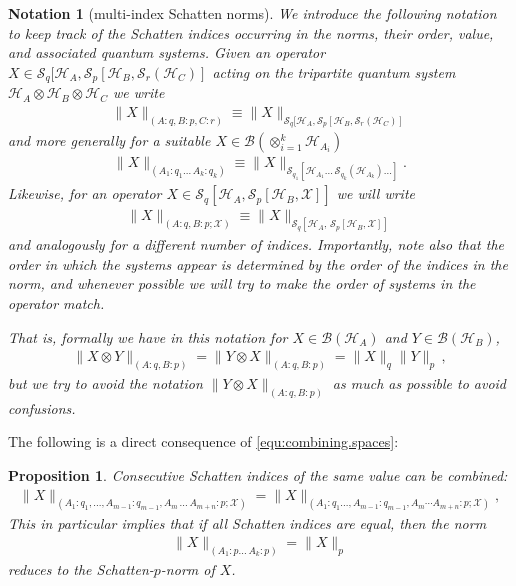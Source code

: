 \documentclass[11pt]{article}
\newcommand{\1}{\ensuremath{\mathbbm{1}}}
\theoremstyle{newdefinition}
\newtheorem{notation}{Notation}
\theoremstyle{newplain}
\newtheorem{proposition}[definition]{Proposition}
\theoremstyle{myplain}
\begin{document}
\begin{notation}[multi-index Schatten norms]
We introduce the following notation to keep track of the Schatten indices occurring in the norms, their order, value, and associated quantum systems.
Given an operator $X\in \mathcal{S}_q[\mathcal{H}_A,\mathcal{S}_p[\mathcal{H}_B,\mathcal{S}_r(\mathcal{H}_C)]$ acting on the tripartite quantum system $\mathcal{H}_A\otimes\mathcal{H}_B\otimes\mathcal{H}_C$ we write 
\begin{align}
    \|X\|_{(A:q,B:p,C:r)} \equiv \|X\|_{\mathcal{S}_q[\mathcal{H}_A,\mathcal{S}_p[\mathcal{H}_B,\mathcal{S}_r(\mathcal{H}_C)]}
\end{align} 
and more generally for a suitable $X\in\mathcal{B}(\otimes_{i=1}^k\mathcal{H}_{A_i})$
\begin{align}
    \|X\|_{(A_1:q_1...\,A_k:q_k)} \equiv \|X\|_{\mathcal{S}_{q_1}[\mathcal{H}_{A_1}...\,\mathcal{S}_{q_k}(\mathcal{H}_{A_k})...]}.
\end{align} 
Likewise, for an operator $X\in \mathcal{S}_q[\mathcal{H}_A,\mathcal{S}_p[\mathcal{H}_B,\mathcal{X}]]$ we will write
\begin{align}
    \|X\|_{(A:q,B:p;\mathcal{X})} \equiv \|X\|_{\mathcal{S}_q[\mathcal{H}_A,\,\mathcal{S}_p[\mathcal{H}_B,\mathcal{X}]]}
\end{align} and analogously for a different number of indices. 
Importantly, note also that the order in which the systems appear is determined by the order of the indices in the norm, and whenever possible we will try to make the order of systems in the operator match.

That is, formally we have in this notation for $X\in\mathcal{B}(\mathcal{H}_A)$ and $Y\in\mathcal{B}(\mathcal{H}_B)$,
\begin{align}
    \|X\otimes Y\|_{(A:q,B:p)} =  \|Y\otimes X\|_{(A:q,B:p)} = \|X\|_q\|Y\|_p\,, 
 \end{align}
 but we try to avoid the notation $\|Y\otimes X\|_{(A:q,B:p)}$ as much as possible to avoid confusions.
\end{notation}
The following is a direct consequence of \eqref{equ:combining.spaces}:
\begin{proposition}
\label{prop:combining.systems}
 Consecutive Schatten indices of the same value can be combined: 
\begin{align}
\|X\|_{(A_1:q_1,...,A_{m-1}:q_{m-1},A_{m}\,...\,A_{m+n}:p;\mathcal{X})} = \|X\|_{(A_1:q_1...,A_{m-1}:q_{m-1},A_{m}\cdots  A_{m+n}:p;\mathcal{X})},
\end{align} 
This in particular implies that if all Schatten indices are equal, then the norm
\begin{align}
    \|X\|_{(A_1:p...\,A_k:p)}=\|X\|_p
\end{align} reduces to the Schatten-$p$-norm of $X$.
\end{proposition}
\end{document}
